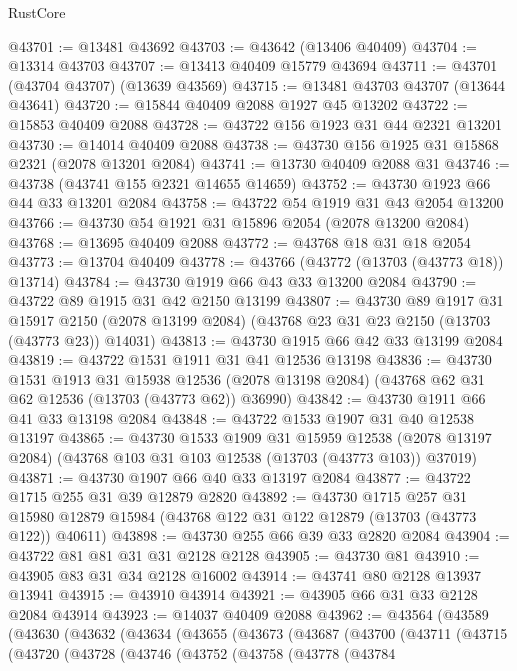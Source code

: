 \begin{lexlean}{RustCore}
\begin{coremodule}
@43701 := @13481 @43692
@43703 := @43642 (@13406 @40409)
@43704 := @13314 @43703
@43707 := @13413 @40409 @15779 @43694
@43711 := @43701 (@43704 @43707) (@13639 @43569)
@43715 := @13481 @43703 @43707 (@13644 @43641)
@43720 := @15844 @40409 @2088 @1927 @45 @13202
@43722 := @15853 @40409 @2088
@43728 := @43722 @156 @1923 @31 @44 @2321 @13201
@43730 := @14014 @40409 @2088
@43738 := @43730 @156 @1925 @31 @15868 @2321 (@2078 @13201 @2084)
@43741 := @13730 @40409 @2088 @31
@43746 := @43738 (@43741 @155 @2321 @14655 @14659)
@43752 := @43730 @1923 @66 @44 @33 @13201 @2084
@43758 := @43722 @54 @1919 @31 @43 @2054 @13200
@43766 := @43730 @54 @1921 @31 @15896 @2054 (@2078 @13200 @2084)
@43768 := @13695 @40409 @2088
@43772 := @43768 @18 @31 @18 @2054
@43773 := @13704 @40409
@43778 := @43766 (@43772 (@13703 (@43773 @18)) @13714)
@43784 := @43730 @1919 @66 @43 @33 @13200 @2084
@43790 := @43722 @89 @1915 @31 @42 @2150 @13199
@43807 := @43730
    @89
    @1917
    @31
    @15917
    @2150
    (@2078 @13199 @2084)
    (@43768 @23 @31 @23 @2150 (@13703 (@43773 @23)) @14031)
@43813 := @43730 @1915 @66 @42 @33 @13199 @2084
@43819 := @43722 @1531 @1911 @31 @41 @12536 @13198
@43836 := @43730
    @1531
    @1913
    @31
    @15938
    @12536
    (@2078 @13198 @2084)
    (@43768 @62 @31 @62 @12536 (@13703 (@43773 @62)) @36990)
@43842 := @43730 @1911 @66 @41 @33 @13198 @2084
@43848 := @43722 @1533 @1907 @31 @40 @12538 @13197
@43865 := @43730
    @1533
    @1909
    @31
    @15959
    @12538
    (@2078 @13197 @2084)
    (@43768 @103 @31 @103 @12538 (@13703 (@43773 @103)) @37019)
@43871 := @43730 @1907 @66 @40 @33 @13197 @2084
@43877 := @43722 @1715 @255 @31 @39 @12879 @2820
@43892 := @43730
    @1715
    @257
    @31
    @15980
    @12879
    @15984
    (@43768 @122 @31 @122 @12879 (@13703 (@43773 @122)) @40611)
@43898 := @43730 @255 @66 @39 @33 @2820 @2084
@43904 := @43722 @81 @81 @31 @31 @2128 @2128
@43905 := @43730 @81
@43910 := @43905 @83 @31 @34 @2128 @16002
@43914 := @43741 @80 @2128 @13937 @13941
@43915 := @43910 @43914
@43921 := @43905 @66 @31 @33 @2128 @2084 @43914
@43923 := @14037 @40409 @2088
@43962 := @43564
    (@43589
      (@43630
        (@43632
          (@43634
            (@43655
              (@43673
                (@43687
                  (@43700
                    (@43711
                      (@43715
                        (@43720
                          (@43728
                            (@43746
                              (@43752
                                (@43758
                                  (@43778
                                    (@43784

\end{coremodule}
\end{lexlean}
